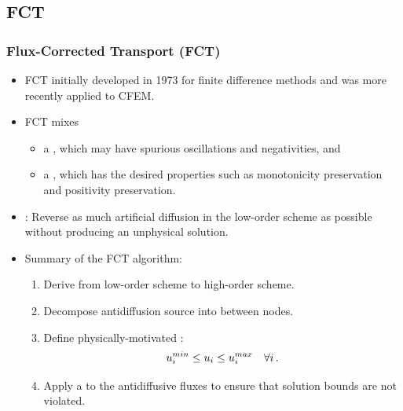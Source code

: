 \subsection{FCT}
\begin{frame}
\frametitle{Flux-Corrected Transport (FCT)}

\begin{itemize}
   \item FCT initially developed in 1973 for finite difference methods
      and was more recently applied to CFEM.
   \item FCT mixes
     \begin{itemize}
       \item a , which may have spurious
         oscillations and negativities, and
       \item a , which has the desired properties
         such as monotonicity preservation and positivity preservation.
     \end{itemize}
   \item {}: Reverse as much artificial diffusion in the
     low-order scheme as possible without producing an unphysical solution.
   \item Summary of the FCT algorithm:
     \begin{enumerate}
       \item Derive  from low-order scheme to high-order
         scheme.
       \item Decompose antidiffusion source into  between nodes.
       \item Define physically-motivated :
         \begin{equation}
           u^{min}_i \leq u_i \leq u^{max}_i \quad \forall i \,.
         \end{equation}
       \item Apply a  to the antidiffusive fluxes to ensure
         that solution bounds are not violated.
     \end{enumerate}
\end{itemize}

\end{frame}
